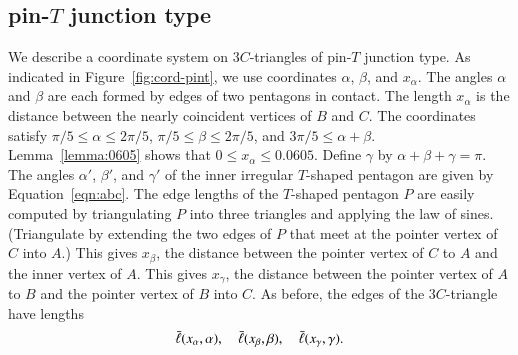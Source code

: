 \subsection{pin-$T$ junction type} We describe a coordinate system on
$3C$-triangles of pin-$T$ junction type.  As indicated in
Figure~\ref{fig:cord-pint}, we use coordinates $\alpha$, $\beta$, and
$x_\alpha$.  The angles $\alpha$ and $\beta$ are each formed by edges
of two pentagons in contact.  The length $x_\alpha$ is the distance
between the nearly coincident vertices of $B$ and $C$.
The coordinates satisfy $\pi/5 \le \alpha \le 2\pi/5$, $\pi/5\le
\beta \le 2\pi/5$, and $3\pi/5 \le \alpha+\beta$.
Lemma~\ref{lemma:0605} shows that $0\le x_\alpha\le 0.0605$.  Define
$\gamma$ by $\alpha+\beta+\gamma = \pi$.  The angles $\alpha'$,
$\beta'$, and $\gamma'$ of the inner irregular $T$-shaped pentagon are
given by Equation~\ref{eqn:abc}.  The edge lengths of the $T$-shaped
pentagon $P$ are easily computed by triangulating $P$ into three
triangles and applying the law of sines.  (Triangulate by extending
the two edges of $P$ that meet at the pointer vertex of $C$ into $A$.)
This gives $x_\beta$, the distance between the pointer vertex of $C$
to $A$ and the inner vertex of $A$.  This gives $x_\gamma$, the
distance between the pointer vertex of $A$ to $B$ and the pointer
vertex of $B$ into $C$.  As before, the edges of the $3C$-triangle
have lengths
\[
\bar\ell(x_\alpha,\alpha),\quad \bar\ell(x_\beta,\beta),\quad \bar\ell(x_\gamma,\gamma).
\]





